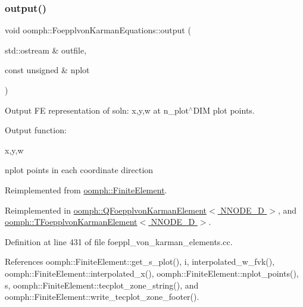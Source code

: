 \subsubsection{\texorpdfstring{output()}{output()}\hspace{0.1cm}{\footnotesize\ttfamily [2/4]}}
{\footnotesize\ttfamily void oomph\+::\+Foepplvon\+Karman\+Equations\+::output (\begin{DoxyParamCaption}\item[{std\+::ostream \&}]{outfile,  }\item[{const unsigned \&}]{nplot }\end{DoxyParamCaption})\hspace{0.3cm}{\ttfamily [virtual]}}



Output FE representation of soln\+: x,y,w at n\+\_\+plot$^\wedge$\+D\+IM plot points. 

Output function\+:

x,y,w

nplot points in each coordinate direction 

Reimplemented from \hyperlink{classoomph_1_1FiniteElement_afa9d9b2670f999b43e6679c9dd28c457}{oomph\+::\+Finite\+Element}.



Reimplemented in \hyperlink{classoomph_1_1QFoepplvonKarmanElement_a7cf9bdcf7294233f27d8fc6c87ac7bbe}{oomph\+::\+Q\+Foepplvon\+Karman\+Element$<$ N\+N\+O\+D\+E\+\_\+D $>$}, and \hyperlink{classoomph_1_1TFoepplvonKarmanElement_abd3241a32dacbf790074198c3c30a8c1}{oomph\+::\+T\+Foepplvon\+Karman\+Element$<$ N\+N\+O\+D\+E\+\_\+D $>$}.



Definition at line 431 of file foeppl\+\_\+von\+\_\+karman\+\_\+elements.\+cc.



References oomph\+::\+Finite\+Element\+::get\+\_\+s\+\_\+plot(), i, interpolated\+\_\+w\+\_\+fvk(), oomph\+::\+Finite\+Element\+::interpolated\+\_\+x(), oomph\+::\+Finite\+Element\+::nplot\+\_\+points(), s, oomph\+::\+Finite\+Element\+::tecplot\+\_\+zone\+\_\+string(), and oomph\+::\+Finite\+Element\+::write\+\_\+tecplot\+\_\+zone\+\_\+footer().

\mbox{\label{classoomph_1_1FoepplvonKarmanEquations_a19d1540525a0c822c059ce50989710a6}} 
